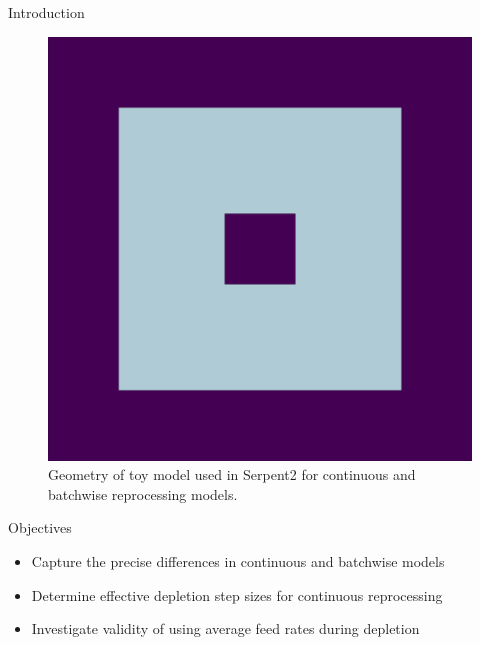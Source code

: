\documentclass[final]{beamer}
\newlength{\onecolwid}
\newlength{\threecolwid}
\begin{document}
\begin{frame}[t]
\begin{columns}[t,totalwidth=\threecolwid]
\begin{column}{\onecolwid}
\begin{block}{Introduction}
\begin{figure}
	\label{fig:toy_geom}
	\includegraphics[width=0.6\linewidth]{images/CR0_geom1.png}
	\caption{Geometry of toy model used in Serpent2 for continuous and batchwise reprocessing models.}
\end{figure}

\end{block}


\begin{alertblock}{Objectives}
\begin{itemize}
        \item Capture the precise differences in continuous and batchwise models
	\item Determine effective depletion step sizes for continuous reprocessing
	\item Investigate validity of using average feed rates during depletion
\end{itemize}

\end{alertblock}





\end{column}
\end{columns}
\end{frame}
\end{document}
